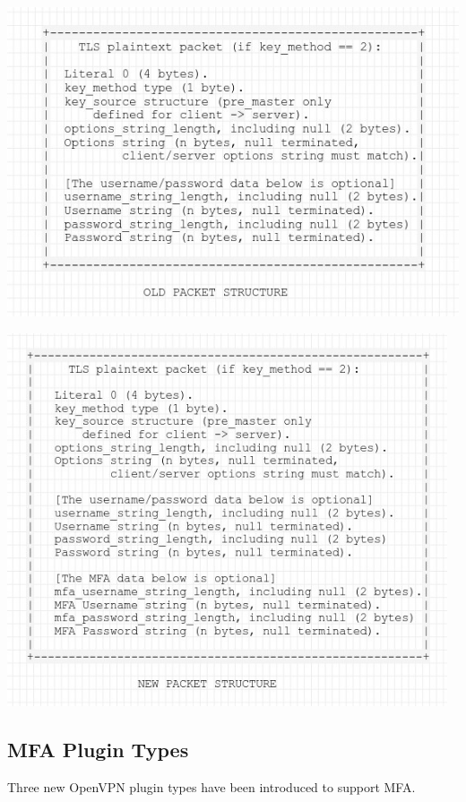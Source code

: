 \documentclass[11pt,oneside]{book}
\begin{document}
\centerline{ \includegraphics[width=150mm]{./old_packet.jpg}}
\centerline{ \includegraphics[width=130mm]{./new_packet.jpg}}

\subsection{MFA Plugin Types}
\label{MFA:Types}
Three new OpenVPN plugin types have been introduced to support MFA.
\end{document}
